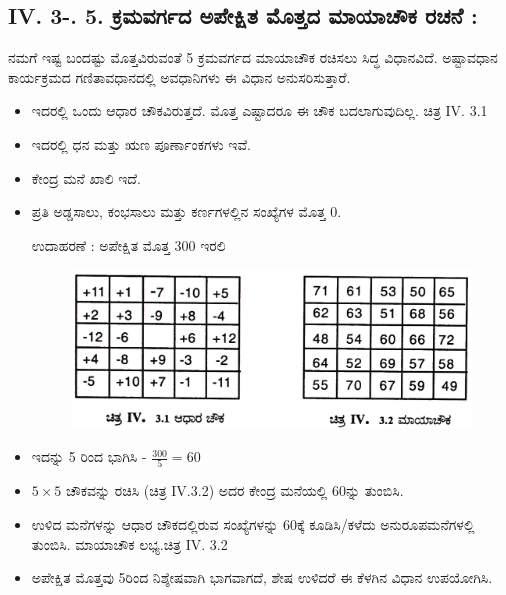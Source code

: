 \subsection*{IV. 3-. 5. ಕ್ರಮವರ್ಗದ ಅಪೇಕ್ಷಿತ ಮೊತ್ತದ ಮಾಯಾಚೌಕ ರಚನೆ :}

ನಮಗೆ ಇಷ್ಟ ಬಂದಷ್ಟು ಮೊತ್ತವಿರುವಂತೆ 5 ಕ್ರಮವರ್ಗದ ಮಾಯಾಚೌಕ ರಚಿಸಲು ಸಿದ್ಧ \linebreak ವಿಧಾನವಿದೆ. ಅಷ್ಟಾವಧಾನ ಕಾರ್ಯಕ್ರಮದ ಗಣಿತಾವಧಾನದಲ್ಲಿ ಅವಧಾನಿಗಳು ಈ ವಿಧಾನ ಅನುಸರಿಸುತ್ತಾರೆ.
\begin{itemize}
	\item ಇದರಲ್ಲಿ ಒಂದು ಆಧಾರ ಚೌಕವಿರುತ್ತದೆ. ಮೊತ್ತ ಎಷ್ಟಾದರೂ ಈ ಚೌಕ ಬದಲಾಗುವುದಿಲ್ಲ. ಚಿತ್ರ IV. 3.1
	\item ಇದರಲ್ಲಿ ಧನ ಮತ್ತು ಋಣ ಪೂರ್ಣಾಂಕಗಳು ಇವೆ.
	\item ಕೇಂದ್ರ ಮನೆ ಖಾಲಿ ಇದೆ.
	\item ಪ್ರತಿ ಅಡ್ಡಸಾಲು, ಕಂಭಸಾಲು ಮತ್ತು ಕರ್ಣಗಳಲ್ಲಿನ ಸಂಖ್ಯೆಗಳ ಮೊತ್ತ 0.

	ಉದಾಹರಣೆ : ಅಪೇಕ್ಷಿತ ಮೊತ್ತ 300 ಇರಲಿ
	\begin{figure}[H]
	\includegraphics{src/figures/chap3/fig3-41.jpg}
	\end{figure}
	\item ಇದನ್ನು 5 ರಿಂದ ಭಾಗಿಸಿ - $\frac{300}{5}=60$
	\item $5 \times 5$ ಚೌಕವನ್ನು ರಚಿಸಿ (ಚಿತ್ರ IV.3.2) ಅದರ ಕೇಂದ್ರ ಮನೆಯಲ್ಲಿ 60ನ್ನು \break ತುಂಬಿಸಿ.
	\item ಉಳಿದ ಮನೆಗಳನ್ನು ಆಧಾರ ಚೌಕದಲ್ಲಿರುವ ಸಂಖ್ಯೆಗಳನ್ನು 60ಕ್ಕೆ ಕೂಡಿಸಿ/ಕಳೆದು ಅನುರೂಪಮನೆಗಳಲ್ಲಿ ತುಂಬಿಸಿ. ಮಾಯಾಚೌಕ ಲಭ್ಯ.ಚಿತ್ರ IV. 3.2
	\item ಅಪೇಕ್ಷಿತ ಮೊತ್ತವು 5ರಿಂದ ನಿಶ್ಶೇಷವಾಗಿ ಭಾಗವಾಗದೆ, ಶೇಷ ಉಳಿದರೆ ಈ ಕೆಳಗಿನ ವಿಧಾನ ಉಪಯೋಗಿಸಿ.


\end{itemize}
